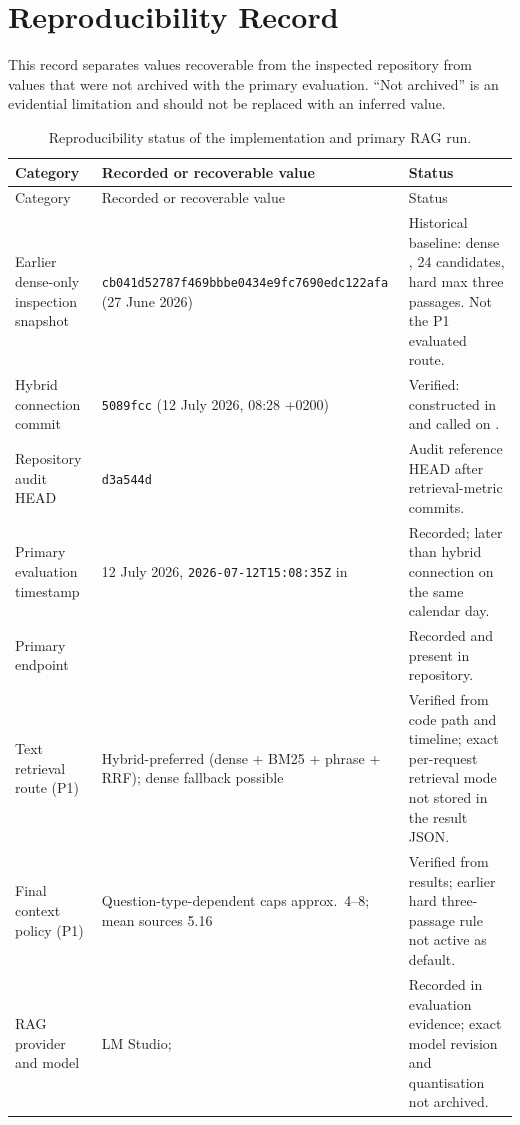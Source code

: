 \chapter{Reproducibility Record}
\label{app:reproducibility}

This record separates values recoverable from the inspected repository from values that were not archived with the primary evaluation. ``Not archived'' is an evidential limitation and should not be replaced with an inferred value.

\begin{longtable}{L{0.30\textwidth}L{0.32\textwidth}L{0.28\textwidth}}
\caption{Reproducibility status of the implementation and primary RAG run.}\label{tab:repro-record}\\
\toprule
Category & Recorded or recoverable value & Status \\
\midrule
\endfirsthead
\toprule
Category & Recorded or recoverable value & Status \\
\midrule
\endhead
Earlier dense-only inspection snapshot & \nolinkurl{cb041d52787f469bbbe0434e9fc7690edc122afa} (27 June 2026) & Historical baseline: dense , 24 candidates, hard max three passages. Not the P1 evaluated route. \\
Hybrid connection commit & \texttt{5089fcc} (12 July 2026, 08:28 +0200) & Verified:  constructed in  and called on . \\
Repository audit HEAD & \texttt{d3a544d} & Audit reference HEAD after retrieval-metric commits. \\
Primary evaluation timestamp & 12 July 2026, \texttt{2026-07-12T15:08:35Z} in  & Recorded; later than hybrid connection on the same calendar day. \\
Primary endpoint &  & Recorded and present in repository. \\
Text retrieval route (P1) & Hybrid-preferred (dense + BM25 + phrase + RRF); dense fallback possible & Verified from code path and timeline; exact per-request retrieval mode not stored in the result JSON. \\
Final context policy (P1) & Question-type-dependent caps approx.\ 4--8; mean sources 5.16 & Verified from results; earlier hard three-passage rule not active as default. \\
RAG provider and model & LM Studio;  & Recorded in evaluation evidence; exact model revision and quantisation not archived. \\

\end{longtable}
